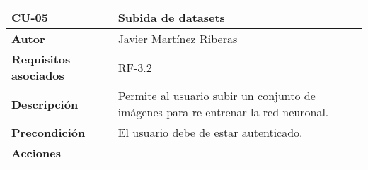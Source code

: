 \begin{longtable}[H]{@{}ll@{}}
\toprule
\begin{minipage}[b]{0.26\columnwidth}\raggedright\strut%
\textbf{CU-05}\strut
\end{minipage} & \begin{minipage}[b]{0.68\columnwidth}\raggedright\strut%
\textbf{Subida de datasets}\strut
\end{minipage}\tabularnewline
\midrule
\endhead
\begin{minipage}[t]{0.26\columnwidth}\raggedright\strut
\textbf{Autor}\strut
\end{minipage} & \begin{minipage}[t]{0.68\columnwidth}\raggedright\strut
Javier Martínez Riberas\strut
\end{minipage}\tabularnewline
\begin{minipage}[t]{0.26\columnwidth}\raggedright\strut
\textbf{Requisitos asociados}\strut
\end{minipage} & \begin{minipage}[t]{0.68\columnwidth}\raggedright\strut%
RF-3.2\strut
\end{minipage}\tabularnewline
\begin{minipage}[t]{0.26\columnwidth}\raggedright\strut
\textbf{Descripción}\strut
\end{minipage} & \begin{minipage}[t]{0.68\columnwidth}\raggedright\strut%
Permite al usuario subir un conjunto de imágenes para re-entrenar la red neuronal.\strut
\end{minipage}\tabularnewline
\begin{minipage}[t]{0.26\columnwidth}\raggedright\strut
\textbf{Precondición}\strut
\end{minipage} & \begin{minipage}[t]{0.68\columnwidth}\raggedright\strut%
El usuario debe de estar autenticado.\strut
\end{minipage}\tabularnewline
\begin{minipage}[t]{0.26\columnwidth}\raggedright\strut
\textbf{Acciones}\strut
\end{minipage} & \begin{minipage}[t]{0.68\columnwidth}\raggedright\strut%

\end{minipage}
\end{longtable}
